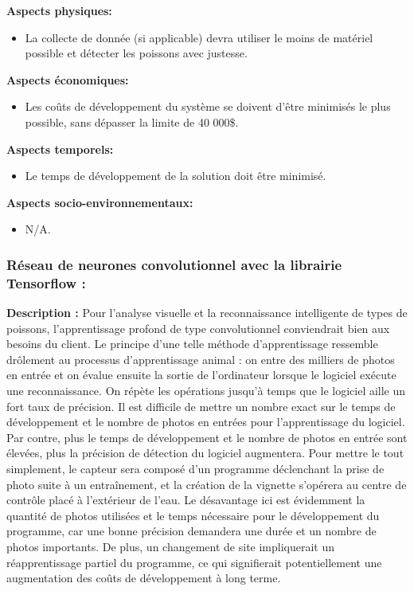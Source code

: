  \textbf{Aspects physiques:}
 \begin{itemize} [label = {--}]
    \item La collecte de donnée (si applicable) devra utiliser le moins de matériel possible et détecter les poissons avec justesse.
\end{itemize}

 \textbf{Aspects économiques:}
 \begin{itemize} [label = {--}]
    \item Les coûts de développement du système se doivent d’être minimisés le plus possible, sans dépasser la limite de 40 000\$.
\end{itemize}

 \textbf{Aspects temporels:}
 \begin{itemize} [label = {--}]
    \item Le temps de développement de la solution doit être minimisé.
\end{itemize}

 \textbf{Aspects socio-environnementaux:}
 \begin{itemize} [label = {--}]
    \item N/A.
\end{itemize}

\subsubsection{Réseau de neurones convolutionnel avec la librairie Tensorflow :}

\textbf{Description :} Pour l’analyse visuelle et la reconnaissance intelligente de types de poissons, l’apprentissage profond de type convolutionnel conviendrait bien aux besoins du client. Le principe d’une telle méthode d’apprentissage ressemble drôlement au processus d’apprentissage animal : on entre des milliers de photos en entrée et on évalue ensuite la sortie de l’ordinateur lorsque le logiciel exécute une reconnaissance. On répète les opérations jusqu’à temps que le logiciel aille un fort taux de précision. Il est difficile de mettre un nombre exact sur le temps de développement et le nombre de photos en entrées pour l’apprentissage du logiciel. Par contre, plus le temps de développement et le nombre de photos en entrée sont élevées, plus la précision de détection du logiciel augmentera.  Pour mettre le tout simplement, le capteur sera composé d’un programme déclenchant la prise de photo suite à un entraînement, et la création de la vignette s’opérera au centre de contrôle placé à l’extérieur de l’eau. Le désavantage ici est évidemment la quantité de photos utilisées et le temps nécessaire pour le développement du programme, car une bonne précision demandera une durée et un nombre de photos importants. De plus, un changement de site impliquerait un réapprentissage partiel du programme, ce qui signifierait potentiellement une augmentation des coûts de développement à long terme.

